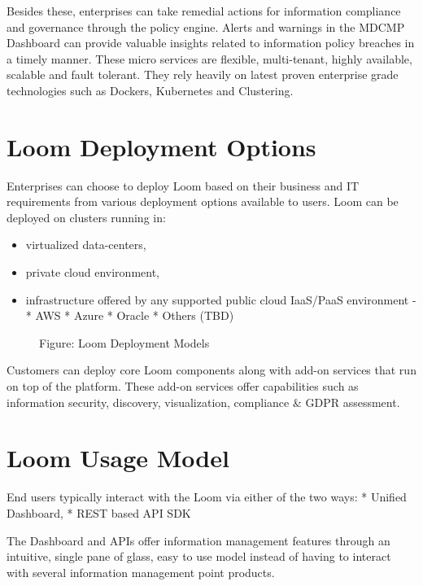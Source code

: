 \documentclass[letterpaper,10pt,english]{sphinxmanual}
\begin{document}
Besides these, enterprises can take remedial actions for information compliance and governance through the policy engine.  Alerts and warnings in the MDCMP Dashboard can provide valuable insights related to information policy breaches in a timely manner.
These micro services are flexible, multi-tenant, highly available, scalable and fault tolerant. They rely heavily on latest proven enterprise grade technologies such as Dockers, Kubernetes and Clustering.


\section{Loom Deployment Options}
\label{\detokenize{mcdmp_concepts:loom-deployment-options}}
Enterprises can choose to deploy Loom based on their business and IT requirements from various deployment options available to users.
Loom can be deployed on clusters running in:
\begin{itemize}
\item {} 
virtualized data-centers,

\item {} 
private cloud environment,

\item {} 
infrastructure offered by any supported public cloud IaaS/PaaS environment -
* AWS
* Azure
* Oracle
* Others (TBD)

\end{itemize}

\begin{figure}[htbp]
\centering
\capstart

\noindent{}
\caption{Figure: Loom Deployment Models}\label{\detokenize{mcdmp_concepts:id5}}\end{figure}

Customers can deploy core Loom components along with add-on services that run on top of the platform.  These add-on services offer capabilities such as information security, discovery, visualization, compliance \& GDPR assessment.


\section{Loom Usage Model}
\label{\detokenize{mcdmp_concepts:loom-usage-model}}
End users typically interact with the Loom via either of the two ways:
* Unified Dashboard,
* REST based API SDK

The Dashboard and APIs offer information management features through an intuitive, single pane of glass, easy to use model instead of having to interact with several information management point products.
\end{document}
